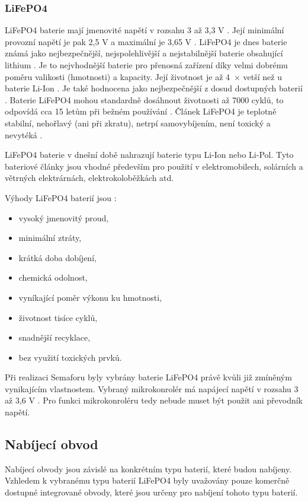 \subsubsection{LiFePO4}
LiFePO4 baterie mají jmenovité napětí v rozsahu 3 až 3,3 V \cite{LiFePO4_malina}. Její minimální provozní napětí je pak 2,5 V a maximální je 3,65 V \cite{LiFePO4_malina}.
LiFePO4 je dnes baterie známá jako nejbezpečnější, nejspolehlivější a nejstabilnější baterie obsahující lithium \cite{LiFePO4_malina}. Je to nejvhodnější baterie pro 
přenosná zařízení díky velmi dobrému poměru valikosti (hmotnosti) a kapacity. Její životnost je až 4~$\times$ vetší než u baterie Li-Ion \cite{LiFePO4_malina}. Je také hodnocena
jako nejbezpečnější z dosud dostupných baterií \cite{LiFePO4_malina}. Baterie LiFePO4 mohou standardně dosáhnout životnosti až 7000 cyklů, to odpovídá cca 15 letům při bežném
používání \cite{LiFePO4_malina}. Článek LiFePO4 je teplotně stabilní, nehořlavý (ani při zkratu), netrpí samovybíjením, není toxický a nevytéká \cite{LiFePO4_malina}.

LiFePO4 baterie v dnešní době nahrazují baterie typu Li-Ion nebo Li-Pol.
Tyto bateriové články jsou vhodné především pro použití v elektromobilech, solárních a větrných elektrárnách, elektrokoloběžkách atd. 

Výhody LiFePO4 baterií jsou \cite{LiFePO4_smart}:
\begin{itemize}
  \item vysoký jmenovitý proud,
  \item minimální ztráty,
  \item krátká doba dobíjení,
  \item chemická odolnost,
  \item vyníkající poměr výkonu ku hmotnosti,
  \item životnost tisíce cyklů,
  \item snadnější recyklace,
  \item bez využití toxických prvků.
\end{itemize}

Při realizaci Semaforu byly vybrány baterie LiFePO4 právě kvůli již zmíněným vynikajícím vlastnostem. Vybraný mikrokonrolér má napájecí napětí v rozsahu 3 až 3,6 V \cite{ESP_C3_dtsh}. 
Pro funkci mikrokonroléru tedy nebude muset být použit ani převodník napětí.  



\subsection{Nabíjecí obvod}
Nabíjecí obvody jsou závislé na konkrétním typu baterií, které budou nabíjeny. Vzhledem k vybranému typu baterií LiFePO4 byly uvažovány pouze komerčně
dostupné integrované obvody, které jsou určeny pro nabíjení tohoto typu baterií. 

